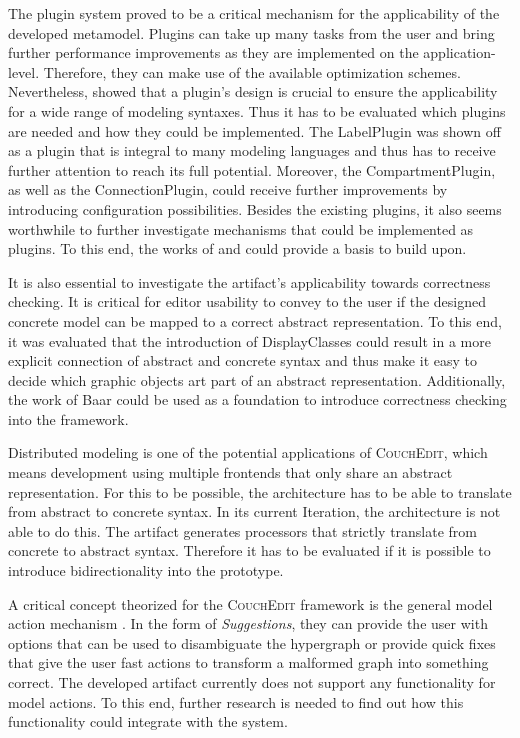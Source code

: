 The plugin system proved to be a critical mechanism for the applicability of the developed metamodel. Plugins can take up many tasks from the user and bring further performance improvements as they are implemented on the application-level. Therefore, they can make use of the available optimization schemes. Nevertheless,  showed that a plugin's design is crucial to ensure the applicability for a wide range of modeling syntaxes. Thus it has to be evaluated which plugins are needed and how they could be implemented. The LabelPlugin was shown off as a plugin that is integral to many modeling languages and thus has to receive further attention to reach its full potential. Moreover, the CompartmentPlugin, as well as the ConnectionPlugin, could receive further improvements by introducing configuration possibilities. Besides the existing plugins, it also seems worthwhile to further investigate mechanisms that could be implemented as plugins. To this end, the works of \cite{van_tendeloo_concrete_2017} and \cite{costagliola_classification_2002} could provide a basis to build upon. 

It is also essential to investigate the artifact's applicability towards correctness checking. It is critical for editor usability to convey to the user if the designed concrete model can be mapped to a correct abstract representation. To this end, it was evaluated that the introduction of DisplayClasses could result in a more explicit connection of abstract and concrete syntax and thus make it easy to decide which graphic objects art part of an abstract representation. Additionally, the work of Baar \cite{baar_correctly_2008} could be used as a foundation to introduce correctness checking into the framework.

Distributed modeling is one of the potential applications of \textsc{CouchEdit}, which means development using multiple frontends that only share an abstract representation. For this to be possible, the architecture has to be able to translate from abstract to concrete syntax. In its current Iteration, the architecture is not able to do this. The artifact generates processors that strictly translate from concrete to abstract syntax. Therefore it has to be evaluated if it is possible to introduce bidirectionality into the prototype. 


A critical concept theorized for the \textsc{CouchEdit} framework is the general model action mechanism \cite{nachreiner_couchedit_2020}. In the form of \emph{Suggestions}, they can provide the user with options that can be used to disambiguate the hypergraph or provide quick fixes that give the user fast actions to transform a malformed graph into something correct. The developed artifact currently does not support any functionality for model actions. To this end, further research is needed to find out how this functionality could integrate with the system.

